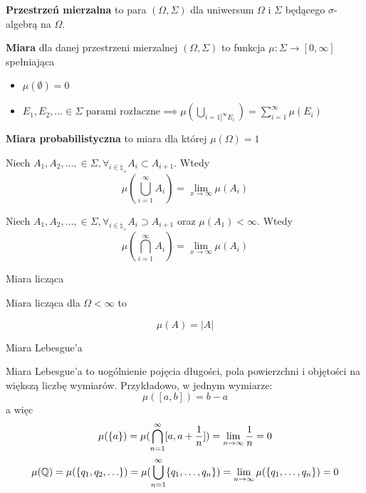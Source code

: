 \begin{definition}
	\textbf{Przestrzeń mierzalna} to para \((\Omega, \Sigma)\) dla uniwersum \(\Omega\) i \(\Sigma\) będącego \(\sigma\)-algebrą na \(\Omega\).
\end{definition}

\begin{definition}
	\textbf{Miara} dla danej przestrzeni mierzalnej \((\Omega, \Sigma)\) to funkcja \(\mu: \Sigma \to [0, \infty]\) spełniająca
	\begin{itemize}
		\item \(\mu(\emptyset) = 0\)
		\item \(E_1, E_2, \dots \in \Sigma \text{ parami rozłaczne} \implies \mu(\bigcup_{i=1]^\infty E_i}) = \sum_{i=1}^{\infty} \mu(E_i)\)
	\end{itemize}
\end{definition}

\begin{definition}
	\textbf{Miara probabilistyczna} to miara dla której \(\mu(\Omega) = 1\)
\end{definition}

\begin{lemma}
	Niech \(A_1, A_2, \dots, \in \Sigma, \forall_{i \in \natural_+} A_i \subset A_{i+1}\). Wtedy
	\[
		\mu(\bigcup_{i=1}^\infty A_i) = \lim_{x \to \infty} \mu(A_i)
	\]
\end{lemma}

\begin{lemma}
	Niech \(A_1, A_2, \dots, \in \Sigma, \forall_{i \in \natural_+} A_i \supset A_{i+1}\) oraz \(\mu(A_1) < \infty\). Wtedy
	\[
		\mu(\bigcap_{i=1}^\infty A_i) = \lim_{x \to \infty} \mu(A_i)
	\]
\end{lemma}

\begin{example}
	Miara licząca
	
	Miara licząca dla \(\Omega < \infty\) to
	
	\[
		\mu(A) = |A|
	\]
\end{example}

\begin{example} 
	Miara Lebesgue'a
	
	Miara Lebesgue'a to uogólnienie pojęcia długości, pola powierzchni i objętości na większą liczbę wymiarów. Przykładowo, w jednym wymiarze:
	\[
		\mu([a, b]) = b - a
	\]
	a więc
	\[
		\mu(\set{a}) = \mu(\bigcap_{n=1}^\infty [a, a + \frac{1}{n}]) = \lim_{n \to \infty} \frac{1}{n} = 0
	\]
	\[
		\mu(\rational) = \mu(\set{q_1, q_2, \dots}) = \mu(\bigcup_{n=1}^\infty \set{q_1, \dots, q_n}) = \lim_{n \to \infty} \mu(\set{q_1, \dots, q_n}) = 0
	\]
\end{example}
